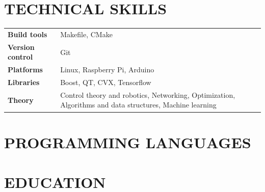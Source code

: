 \documentclass{ResumeTemplate}
\begin{document}
    \raggedright\begin{minipage}[t]{0.64\linewidth} 

        \section{TECHNICAL SKILLS}

        \noindent\begin{tabularx}{\linewidth}{>{\bfseries}lX}
           Build tools     & Makefile, CMake \\
           Version control & Git \\
           Platforms       & Linux, Raspberry Pi, Arduino \\
           Libraries       & Boost, QT, CVX, Tensorflow \\
           Theory          & Control theory and robotics, Networking, Optimization, Algorithms and data structures, Machine learning
        \end{tabularx}
    \end{minipage}
    \hspace{0.01\linewidth}
    \raggedright\begin{minipage}[t]{0.33\linewidth} 
        \section{PROGRAMMING LANGUAGES}


    \end{minipage}

    \section{EDUCATION}
\end{document}
